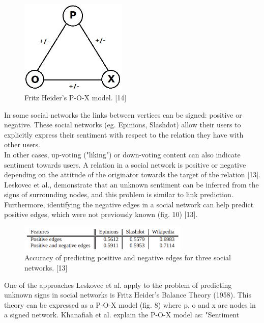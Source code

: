 \documentclass[conference,letterpaper]{IEEEtran}
\begin{document}
\begin{center}
\begin{figure}[hb]
\centering
\includegraphics[width=2.0in]{pox}
\caption{
Fritz Heider's P-O-X model. [14]
}
\label{fig_sim8}
\end{figure}
\end{center}
In some social networks the links between vertices can be signed: positive or negative. These social networks
(eg. Epinions, Slashdot) allow their users to explicitly express their sentiment with respect to the relation
they have with other users.\\
In other cases, up-voting ("liking") or down-voting content can also indicate sentiment towards users.
A relation in a social network is positive or negative depending on the attitude of the originator towards the
target of the relation [13]. Leskovec et al., demonstrate that an unknown sentiment can be inferred from the
signs of surrounding nodes, and this problem is similar to link prediction. Furthermore, identifying the
negative edges in a social network can help predict positive edges, which were not previously known (fig. 10) [13]. \\
\begin{center}
\begin{figure}[hb]
\centering
\includegraphics[width=3.2in]{predicting_positive}
\caption{
Accuracy of predicting positive and negative edges for three social networks. [13]
}
\label{fig_sim9}
\end{figure}
\end{center}
One of the approaches Leskovec et al. apply to the problem of predicting unknown signs in social networks
is Fritz Heider's Balance Theory (1958). This theory can be expressed as a P-O-X model (fig. 8)
where p, o and x are nodes in a signed network. Khanafiah et al. explain the P-O-X model as: "Sentiment
\end{document}
